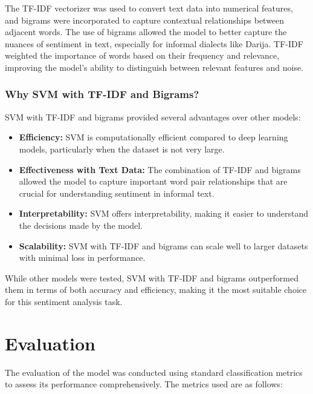 \documentclass[a4paper,40pt,twocolumn]{article}
\begin{document}
The TF-IDF vectorizer was used to convert text data into numerical features, and bigrams were incorporated to capture contextual relationships between adjacent words. The use of bigrams allowed the model to better capture the nuances of sentiment in text, especially for informal dialects like Darija. TF-IDF weighted the importance of words based on their frequency and relevance, improving the model's ability to distinguish between relevant features and noise.

\subsubsection{Why SVM with TF-IDF and Bigrams?}
SVM with TF-IDF and bigrams provided several advantages over other models:
\begin{itemize}
    \item \textbf{Efficiency:} SVM is computationally efficient compared to deep learning models, particularly when the dataset is not very large.
    \item \textbf{Effectiveness with Text Data:} The combination of TF-IDF and bigrams allowed the model to capture important word pair relationships that are crucial for understanding sentiment in informal text.
    \item \textbf{Interpretability:} SVM offers interpretability, making it easier to understand the decisions made by the model.
    \item \textbf{Scalability:} SVM with TF-IDF and bigrams can scale well to larger datasets with minimal loss in performance.
\end{itemize}

While other models were tested, SVM with TF-IDF and bigrams outperformed them in terms of both accuracy and efficiency, making it the most suitable choice for this sentiment analysis task.
\section{Evaluation}

The evaluation of the model was conducted using standard classification metrics to assess its performance comprehensively. The metrics used are as follows:
\end{document}
